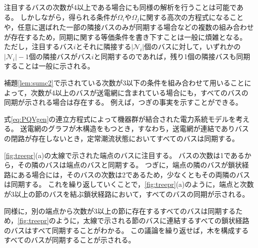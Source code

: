 \documentclass[tombow,dvipdfmx]{corona-a5}
\begin{document}
注目するバスの次数が4以上である場合にも同様の解析を行うことは可能である。
しかしながら，得られる条件が$\Omega_i$や$\Omega_j$に関する高次の方程式になることや，任意に選ばれた一部の隣接バスのみが同期する場合などの複数の組み合わせが存在するため，同期に関する等価条件を書き下すことは一般に煩雑となる。
ただし，注目するバス$i$とそれに隣接する$|\mathcal{N}_i|$個のバスに対して，いずれかの$|\mathcal{N}_i |-1$個の隣接バスがバス$i$と同期するのであれば，残り1個の隣接バスも同期することは一般に示される。

補題\ref{lem:sumc2}で示されている次数が3以下の条件を組み合わせて用いることによって，次数が4以上のバスが送電網に含まれている場合にも，すべてのバスの同期が示される場合は存在する。
例えば，つぎの事実を示すことができる。

\begin{定理}\label{thm:tree}
式\ref{eq:PQVgen}の連立方程式によって機器群が結合された電力系統モデルを考える。
送電網のグラフが木構造をもつとき，すなわち，送電網が連結でありバスの閉路が存在しないとき，定常潮流状態においてすべてのバスは同期する。
\end{定理}

\begin{証明}
\ref{fig:treepr}(a)の太線で示された端点のバスに注目する。
バスの次数は1であるから，その隣のバスは端点のバスと同期する。
つぎに，端点の隣のバスが鎖状経路にある場合には，そのバスの次数は2であるため，少なくともその両隣のバスは同期する。
これを繰り返していくことで，\ref{fig:treepr}(a)のように，端点と次数が3以上の節のバスを結ぶ鎖状経路において，すべてのバスの同期が示される。

同様に，別の端点から次数が3以上の節に存在するすべてのバスは同期するため，\ref{fig:treepr}のように，太線で示される節のバスに連結するすべての鎖状経路のバスはすべて同期することがわかる。
この議論を繰り返せば，木を構成するすべてのバスが同期することが示される。
\end{証明}
\end{document}
